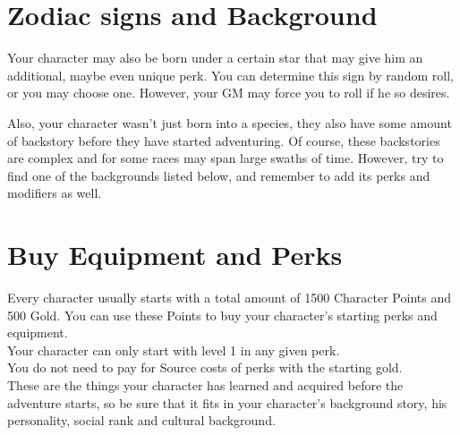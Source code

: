 \section{Zodiac signs and Background}\label{sec:charCreationBackgrounds}

Your character may also be born under a certain star that may give him an additional, maybe even unique perk.
You can determine this sign by random roll, or you may choose one.
However, your GM may force you to roll if he so desires.

Also, your character wasn't just born into a species, they also have some amount of backstory before they have started adventuring.
Of course, these backstories are complex and for some races may span large swaths of time.
However, try to find one of the backgrounds listed below, and remember to add its perks and modifiers as well.


\section{Buy Equipment and Perks}\label{sec:charCreationPerkAndEquip}

Every character usually starts with a total amount of 1500 Character Points and 500 Gold.
You can use these Points to buy your character's starting perks and equipment.\\
Your character can only start with level 1 in any given perk.\\
You do not need to pay for Source costs of perks with the starting gold.\\
These are the things your character has learned and acquired before the adventure starts, so be sure that it fits in your character's background story, his personality, social rank and cultural background.\\
